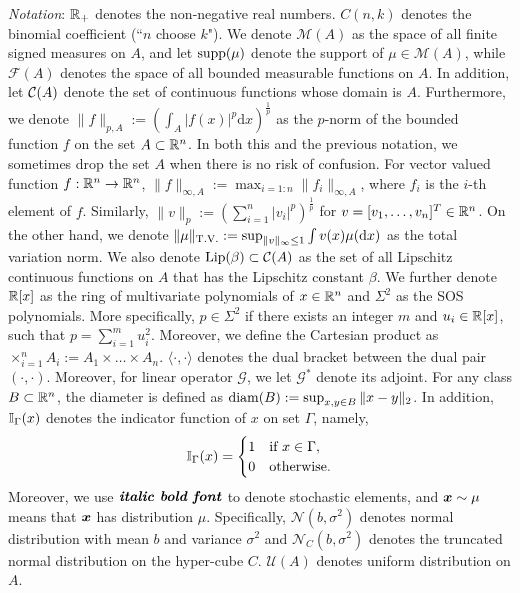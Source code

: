 \textit{Notation}: 
$\mathbb{R}_+$ denotes the non-negative real numbers. $C(n,k)$ denotes the binomial coefficient (``$n$ choose $k$").
We denote $\mathcal{M}(A)$ as the space of all finite signed measures on $A$, and let $\operatorname*{supp}(\mu)$ denote the support of $\mu\in\mathcal{M}(A)$, while $\mathscr{F}(A)$ denotes the space of all bounded measurable functions on $A$. In addition, let $\mathcal{C}(A)$ denote the set of continuous functions whose domain is $A$. 
Furthermore, we denote $\|f\|_{p,A}:=\left(\int_A\left|f(x)\right|^p\mathrm{d}x\right)^{\frac{1}{p}}$ as the $p$-norm of the bounded function $f$ on the set $A\subset \mathbb{R}^n$. In both this and the previous notation, we sometimes drop the set $A$ when there is no risk of confusion.
For vector valued function $f:\mathbb{R}^n\rightarrow\mathbb{R}^n$, $\|f\|_{\infty,A}:=\max_{i=1:n}\|f_i\|_{\infty,A}$, where $f_i$ is the $i$-th element of $f$.
Similarly, $\|v\|_p:=\left(\sum_{i=1}^n|v_i|^p\right)^{\frac{1}{p}}$ for $v=[v_1,\ldots,v_n]^T\in\mathbb{R}^n$.
On the other hand, we denote $\|\mu\|_{\tv}:=\sup_{\|v\|_\infty\leq 1}\int v(x) \mu(\mathrm{d}x)$ as the total variation norm.
We also denote $\operatorname*{Lip}(\beta)\subset \mathcal{C}(A)$ as the set of all Lipschitz continuous functions on $A$ that has the Lipschitz constant $\beta$.
We further denote $\mathbb{R}[x]$ as the ring of multivariate polynomials of $x\in\mathbb{R}^n$ and $\Sigma^2$ as the SOS polynomials. More specifically, $p\in\Sigma^2$ if there exists an integer $m$ and $u_i\in\mathbb{R}[x]$, such that $p=\sum_{i=1}^m u_i^2$.
Moreover, we define the Cartesian product as $\times_{i=1}^n A_i := A_1\times \ldots \times A_n$.
$\langle\cdot,\cdot\rangle$ denotes the dual bracket between the dual pair $(\cdot,\cdot)$.
Moreover, for linear operator $\mathscr{G}$, we let $\mathscr{G}^*$ denote its adjoint.
For any class $B\subset \mathbb{R}^n$, the diameter is defined as $\operatorname*{diam}(B):=\sup_{x,y\in B}\|x-y\|_2$.
In addition, $\mathbb{I}_{\Gamma}(x)$ denotes the indicator function of $x$ on set $\Gamma$, namely,
\[
\mathbb{I}_\Gamma(x) = 
\begin{cases}
1 &\mbox{if } x\in\Gamma,\\
0 &\mbox{otherwise}.
\end{cases}
\]
Moreover, we use $\textbf{\textit{italic bold font}}$ to denote stochastic elements, and $\bm{x} \sim \mu$ means that $\bm{x}$ has distribution $\mu$. Specifically, $\mathcal{N}(b, \sigma^2)$ denotes normal distribution with mean $b$ and variance $\sigma^2$ and $\mathcal{N}_C(b, \sigma^2)$ denotes the truncated normal distribution on the hyper-cube $C$. $\mathcal{U}(A)$ denotes uniform distribution on $A$.
